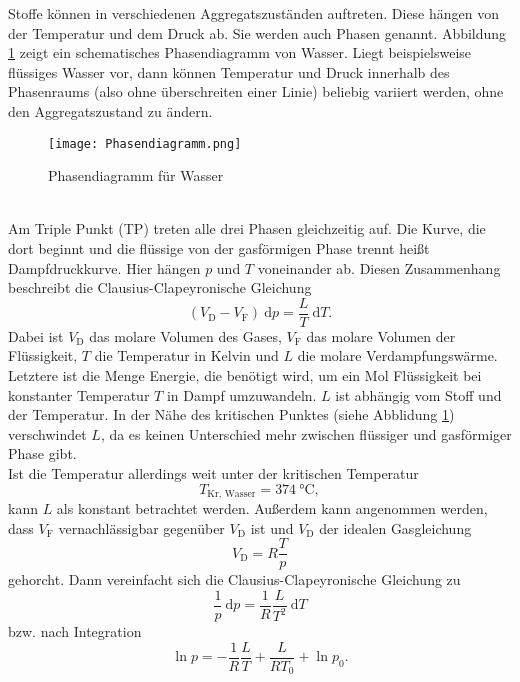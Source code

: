Stoffe können in verschiedenen Aggregatszuständen auftreten. Diese hängen von der Temperatur und dem Druck ab. Sie werden auch Phasen genannt. Abbildung \ref{Phasendiagramm} zeigt ein schematisches Phasendiagramm von Wasser. Liegt beispielsweise flüssiges Wasser vor, dann können Temperatur und Druck innerhalb des Phasenraums (also ohne überschreiten einer Linie) beliebig variiert werden, ohne den Aggregatszustand zu ändern.
\begin{figure}[ht!]
	\centering
	\texttt{[image: Phasendiagramm.png]}
	\caption{Phasendiagramm für Wasser\cite{V203}}
	\label{Phasendiagramm}
\end{figure} \\
Am Triple Punkt (TP) treten alle drei Phasen gleichzeitig auf. Die Kurve, die dort beginnt und die flüssige von der gasförmigen Phase trennt heißt Dampfdruckkurve. Hier hängen $p$ und $T$ voneinander ab. Diesen Zusammenhang beschreibt die Clausius-Clapeyronische Gleichung
\begin{equation}\label{Clausius}
	(V_\text{D}-V_\text{F})\ \text{d}p = \frac{L}{T}\ \text{d}T.
\end{equation}
Dabei ist $V_\text{D}$ das molare Volumen des Gases, $V_\text{F}$ das molare Volumen der Flüssigkeit, $T$ die Temperatur in Kelvin und $L$ die molare Verdampfungswärme. \\
Letztere ist die Menge Energie, die benötigt wird, um ein Mol Flüssigkeit bei konstanter Temperatur $T$ in Dampf umzuwandeln. $L$ ist abhängig vom Stoff und der Temperatur. In der Nähe des kritischen Punktes (siehe Abblidung \ref{Phasendiagramm}) verschwindet $L$, da es keinen Unterschied mehr zwischen flüssiger und gasförmiger Phase gibt. \\
Ist die Temperatur allerdings weit unter der kritischen Temperatur \[T_\text{Kr, Wasser} = \SI{374}{\celsius},\] kann $L$ als konstant betrachtet werden. Außerdem kann angenommen werden, dass $V_\text{F}$ vernachlässigbar gegenüber $V_\text{D}$ ist und $V_\text{D}$ der idealen Gasgleichung
\begin{equation}\label{ideales Gas}
	V_\text{D} = R\frac{T}{p}
\end{equation}
gehorcht. Dann vereinfacht sich die Clausius-Clapeyronische Gleichung zu
\begin{equation}\label{Clausius einfach}
	\frac{1}{p}\ \text{d}p = \frac{1}{R}\frac{L}{T^2}\ \text{d}T
\end{equation}
bzw. nach Integration
\begin{equation}\label{Regression ln(p)=1/T}
	\ln p = - \frac{1}{R}\frac{L}{T} + \frac{L}{RT_0}+\ln p_0.
\end{equation}